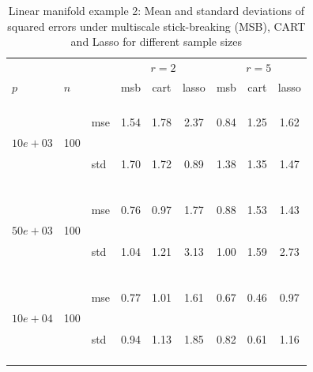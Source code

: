 \documentclass{article} %
\newcommand{\efoo}{\end{footnotesize}}
\newcommand{\bfoo}{\begin{footnotesize}}
\begin{document}
\begin{table}[t]
\caption{Linear manifold example 2: Mean and standard deviations of squared errors under multiscale stick-breaking (MSB), CART and Lasso for different sample sizes}\label{table:linear2}
\vskip 0.15in
\begin{center}
\begin{small}
\begin{sc}
\begin{tabular}{lllcccccc}
\hline
&&&\multicolumn{3}{c}{$r=2$}&\multicolumn{3}{c}{$r=5$}\\
$p$&$n$& & msb&cart&lasso & msb&cart&lasso \\

%
%
\\

\multirow{2}{*}{$10e+03$}&\multirow{2}{*}{100}&\bfoo mse\efoo&1.54 &1.78&2.37&0.84&1.25&1.62\\
&&\bfoo std\efoo &1.70&1.72&0.89&1.38&1.35&1.47\\


\\
\multirow{2}{*}{$50e+03$}&\multirow{2}{*}{100}&\bfoo mse\efoo&0.76&0.97&1.77&0.88&1.53&1.43\\
&&\bfoo std\efoo &1.04&1.21&3.13&1.00&1.59&2.73\\

\\

\multirow{2}{*}{$10e+04$}&\multirow{2}{*}{100}&\bfoo mse\efoo&0.77 &1.01&1.61&0.67&0.46&0.97\\
&&\bfoo std\efoo &0.94&1.13&1.85&0.82&0.61&1.16\\
\\


\end{tabular}
\end{sc}
\end{small}
\end{center}
\end{table}
\end{document}
